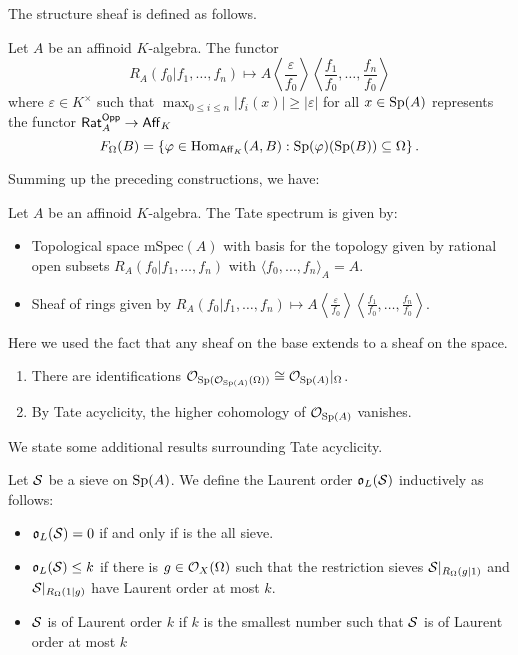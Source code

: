 The structure sheaf is defined as follows. 
\begin{definition}\label{def: structure sheaf of the Tate spectrum}
    Let $A$ be an affinoid $K$-algebra. The functor $$R_{A}(f_{0}|f_{1},\dots,f_{n})\mapsto A\left\langle\frac{\varepsilon}{f_{0}}\right\rangle\left\langle\frac{f_{1}}{f_{0}},\dots,\frac{f_{n}}{f_{0}}\right\rangle$$ where $\varepsilon\in K^{\times}$ such that $\max_{0\leq i\leq n}|f_{i}(x)|\geq|\varepsilon|$ for all $x\in\mathrm{Sp}(A)$ represents the functor $\mathsf{Rat}_{A}^{\mathsf{Opp}}\to\mathsf{Aff}_{K}$
    $$F_{\Omega}(B)=\left\{\varphi\in\mathrm{Hom}_{\mathsf{Aff}_{K}}(A,B):\mathrm{Sp}(\varphi)(\mathrm{Sp}(B))\subseteq\Omega\right\}.$$
\end{definition}
Summing up the preceding constructions, we have:
\begin{definition}\label{def: Tate spectrum as a ringed space}
    Let $A$ be an affinoid $K$-algebra. The Tate spectrum is given by:
    \begin{itemize}
        \item Topological space $\mathrm{mSpec}(A)$ with basis for the topology given by rational open subsets $R_{A}(f_{0}|f_{1},\dots,f_{n})$ with $\langle f_{0},\dots,f_{n}\rangle_{A}=A$. 
        \item Sheaf of rings given by $R_{A}(f_{0}|f_{1},\dots,f_{n})\mapsto A\left\langle\frac{\varepsilon}{f_{0}}\right\rangle\left\langle\frac{f_{1}}{f_{0}},\dots,\frac{f_{n}}{f_{0}}\right\rangle$. 
    \end{itemize}
\end{definition}
Here we used the fact that any sheaf on the base extends to a sheaf on the space. 
\begin{remark}
    \begin{enumerate}[label=(\roman*)]
        \item There are identifications $\mathcal{O}_{\mathrm{Sp}(\mathcal{O}_{\mathrm{Sp}(A)}(\Omega))}\cong\mathcal{O}_{\mathrm{Sp}(A)}|_{\Omega}$. 
        \item By Tate acyclicity, the higher cohomology of $\mathcal{O}_{\mathrm{Sp}(A)}$ vanishes.
    \end{enumerate} 
\end{remark}
We state some additional results surrounding Tate acyclicity. 
\begin{definition}\label{def: Laurent order}
    Let $\mathcal{S}$ be a sieve on $\mathrm{Sp}(A)$. We define the Laurent order $\mathfrak{o}_{L}(\mathcal{S})$ inductively as follows:
    \begin{itemize}
        \item $\mathfrak{o}_{L}(\mathcal{S})=0$ if and only if is the all sieve. 
        \item $\mathfrak{o}_{L}(\mathcal{S})\leq k$ if there is $g\in\mathcal{O}_{X}(\Omega)$ such that the restriction sieves $\mathcal{S}|_{R_{\Omega}(g|1)}$ and $\mathcal{S}|_{R_{\Omega}(1|g)}$ have Laurent order at most $k$. 
        \item $\mathcal{S}$ is of Laurent order $k$ if $k$ is the smallest number such that $\mathcal{S}$ is of Laurent order at most $k$
    \end{itemize}
\end{definition}
